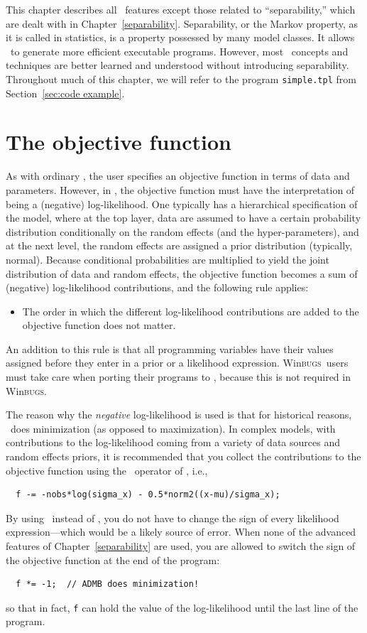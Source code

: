 \documentclass{admbmanual}
\newcommand{\scWinBUGS}{Win\textsc{bugs}}
\begin{document}
This chapter describes all \scAR\ features except those related to
``separability,'' which are dealt with in Chapter~\ref{separability}.
Separability, or the Markov property, as it is called in statistics, is a
property possessed by many model classes. It allows \scAR\ to generate more
efficient executable programs. However, most \scAR\ concepts and techniques are
better learned and understood without introducing separability. Throughout much
of this chapter, we will refer to the program \texttt{simple.tpl} from
Section~\ref{sec:code example}.

\section{The objective function}

As with ordinary \scAB, the user specifies an objective function in terms of
data and parameters. However, in \scAR, the objective function must have the
interpretation of being a (negative) log-likelihood. One typically has a
hierarchical specification of the model, where at the top layer, data are
assumed to have a certain probability distribution conditionally on the random
effects (and the hyper-parameters), and at the next level, the random effects
are assigned a prior distribution (typically, normal). Because conditional
probabilities are multiplied to yield the joint distribution of data and random
effects, the objective function becomes a sum of (negative) log-likelihood
contributions, and the following rule applies:
\begin{itemize}
  \item[$\bigstar$]
  The order in which the different log-likelihood contributions are added to the
  objective function does not matter.
\end{itemize}
An addition to this rule is that all programming variables have their values
assigned before they enter in a prior or a likelihood expression. \scWinBUGS\
users must take care when porting their programs to \scAB, because this is not
required in \scWinBUGS.

The reason why the {\it negative} log-likelihood is used is that for historical
reasons, \scAB\ does minimization (as opposed to maximization). In complex
models, with contributions to the log-likelihood coming from a variety of data
sources and random effects priors, it is recommended that you collect the
contributions to the objective function using the \ttminuseq\ operator of
\cplus, i.e.,
\begin{lstlisting}
  f -= -nobs*log(sigma_x) - 0.5*norm2((x-mu)/sigma_x);
\end{lstlisting}
By using \ttminuseq\ instead of \ttpluseq, you do not have to change the sign of
every likelihood expression---which would be a likely source of error. When none
of the advanced features of Chapter~\ref{separability} are used, you are allowed
to switch the sign of the objective function at the end of the program:
\begin{lstlisting}
  f *= -1;  // ADMB does minimization!
\end{lstlisting}
so that in fact, \texttt{f} can hold the value of the log-likelihood until the
last line of the program.
\end{document}
